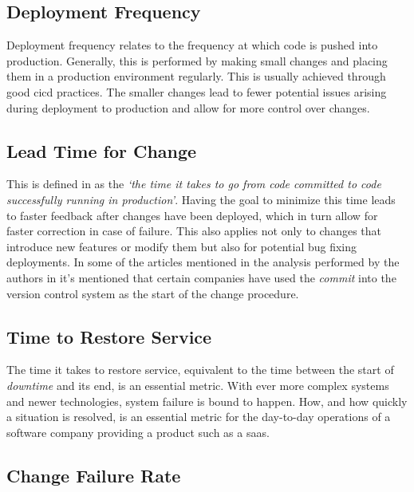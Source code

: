 \subsection{Deployment Frequency}\label{state-of-the-art:ss:deployment-frequency}

Deployment frequency relates to the frequency at which code is pushed into production. Generally, this is performed by making small changes and placing them in a production environment regularly. This is usually achieved through good \gls{cicd} practices. The smaller changes lead to fewer potential issues arising during deployment to production and allow for more control over changes.

\subsection{Lead Time for Change}\label{state-of-the-art:ss:lead-time-for-change}

This is defined in \parencite{48455} as the \textit{`the time it takes to go from code committed to code successfully running in production'}. Having the goal to minimize this time leads to faster feedback after changes have been deployed, which in turn allow for faster correction in case of failure. This also applies not only to changes that introduce new features or modify them but also for potential bug fixing deployments. In some of the articles mentioned in the analysis performed by the authors in \parencite{sallin_kropp_anslow_quilty_meier_2021} it's mentioned that certain companies have used the \textit{commit} into the version control system as the start of the change procedure.

\subsection{Time to Restore Service}\label{state-of-the-art:ss:time-to-restore-service}

The time it takes to restore service, equivalent to the time between the start of \textit{downtime} and its end, is an essential metric. With ever more complex systems and newer technologies, system failure is bound to happen. How, and how quickly a situation is resolved, is an essential metric for the day-to-day operations of a software company providing a product such as a \gls{saas}. 

\subsection{Change Failure Rate}\label{state-of-the-art:ss:change-failure-rate}

